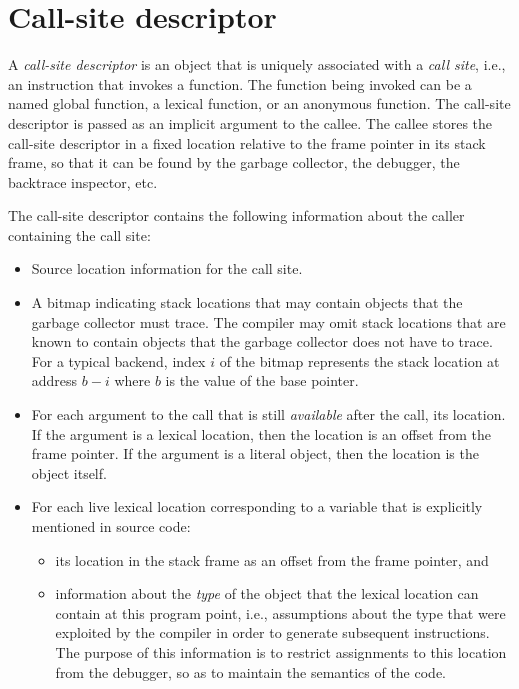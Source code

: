 \section{Call-site descriptor}

A \emph{call-site descriptor} is an object that is uniquely associated
with a \emph{call site}, i.e., an instruction that invokes a function.
The function being invoked can be a named global function, a lexical
function, or an anonymous function.  The call-site descriptor is
passed as an implicit argument to the callee.  The callee stores the
call-site descriptor in a fixed location relative to the frame pointer
in its stack frame, so that it can be found by the garbage collector,
the debugger, the backtrace inspector, etc.

The call-site descriptor contains the following information about the
caller containing the call site:

\begin{itemize}
\item Source location information for the call site.
\item A bitmap indicating stack locations that may contain objects
  that the garbage collector must trace.  The compiler may omit stack
  locations that are known to contain \commonlisp{} objects that the
  garbage collector does not have to trace.  For a typical backend,
  index $i$ of the bitmap represents the stack location at address
  $b-i$ where $b$ is the value of the base pointer.
\item For each argument to the call that is still \emph{available}
  after the call, its location.  If the argument is a lexical
  location, then the location is an offset from the frame pointer.
  If the argument is a literal object, then the location is the object
  itself.
\item For each live lexical location corresponding to a variable that
  is explicitly mentioned in source code:
  \begin{itemize}
  \item its location in the stack frame as an offset from the frame
    pointer, and
  \item information about the \emph{type} of the object that the
    lexical location can contain at this program point, i.e.,
    assumptions about the type that were exploited by the compiler in
    order to generate subsequent instructions.  The purpose of this
    information is to restrict assignments to this location from the
    debugger, so as to maintain the semantics of the code.
  \end{itemize}
\end{itemize}

